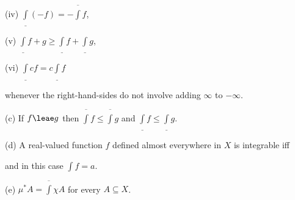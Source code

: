 \vskip2pt 
      
\quad (iv) $\underline{\int}(-f)=-\overline{\int}f$, 
      
\vskip2pt 
      
\quad (v) $\underline{\int}f+g\ge\underline{\int}f+\underline{\int}g$, 
      
\vskip2pt 
      
\quad (vi) $\underline{\int}cf=c\underline{\int}f$ 
      
\vskip2pt 
      
\noindent whenever the right-hand-sides do not involve adding $\infty$ 
to $-\infty$. 
      
(c) If $f\leae g$ then $\overline{\int}f\le\overline{\int}g$ and 
$\underline{\int}f\le\underline{\int}g$. 
      
(d) A real-valued function $f$ defined almost everywhere in $X$ is 
integrable iff 
      
      
\noindent and in this case $\int f=a$. 
      
(e) $\mu^*A=\overline{\int}\chi A$ for every $A\subseteq X$. 
 
